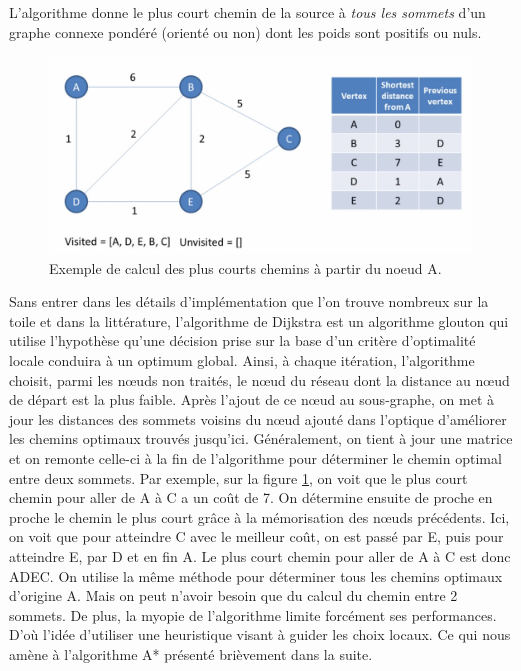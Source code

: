 L'algorithme donne le plus court chemin de la source à \textit{tous les sommets} d'un graphe 
connexe pondéré (orienté ou non) dont les poids sont positifs ou nuls.



 


\begin{figure}[htp]
  \centering
  \includegraphics[width=15cm]{images/algo_dij}
  \caption{Exemple de calcul des plus courts chemins à partir du noeud A.}
  \label{fig:graph_dij}
\end{figure}

Sans entrer dans les détails d'implémentation que l'on trouve nombreux sur la toile et dans la littérature, l'algorithme de Dijkstra est 
un algorithme glouton qui utilise l'hypothèse qu'une décision prise sur la base
d'un critère d'optimalité locale conduira à un optimum global. Ainsi, à chaque itération, l'algorithme choisit, parmi les nœuds non traités, le nœud
du réseau dont la distance au nœud de départ est la plus faible. Après l'ajout de ce nœud au sous-graphe, on met à jour les distances des sommets voisins du nœud ajouté dans l'optique d'améliorer les chemins optimaux trouvés jusqu'ici. Généralement, on tient à jour une matrice et on remonte celle-ci à la fin de l'algorithme pour déterminer le chemin optimal entre deux sommets. Par exemple, sur la figure \ref{fig:graph_dij}, on voit que le plus court chemin pour aller de A à C a un coût de 7. On détermine ensuite de proche en proche le chemin le plus court grâce à la mémorisation des nœuds précédents. Ici, on voit que pour atteindre C avec le meilleur coût, on est passé par E, puis pour atteindre E, par D et en fin A. Le plus court chemin pour aller de A à C est donc ADEC. On utilise la même méthode pour déterminer tous les chemins optimaux 
d'origine A. Mais on peut n'avoir besoin que du calcul du chemin entre 2 sommets. De plus, la myopie de l'algorithme limite forcément ses performances. D'où l'idée
d'utiliser une heuristique visant à guider les choix locaux. Ce qui nous amène à l'algorithme A* présenté brièvement dans la suite.

